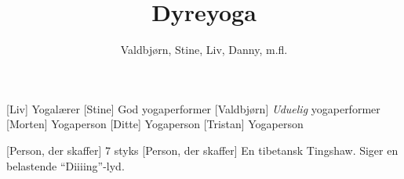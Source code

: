 \documentclass[a4paper,11pt]{article}
\title{Dyreyoga}
\author{Valdbjørn, Stine, Liv, Danny, m.fl.}
\begin{document}
\maketitle

\begin{roles}
    [Liv] Yogalærer
    [Stine] God yogaperformer
    [Valdbjørn] \emph{Uduelig} yogaperformer
    [Morten] Yogaperson
    [Ditte] Yogaperson
    [Tristan] Yogaperson
\end{roles}

\begin{props}
    [Person, der skaffer] 7 styks
    [Person, der skaffer] En tibetansk Tingshaw. Siger en belastende ``Diiiing''-lyd.
\end{props}
\end{document}
